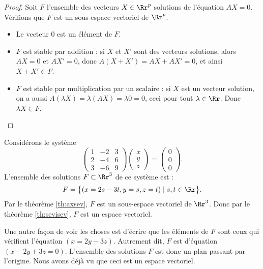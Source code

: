 \documentclass[class=report,crop=false]{standalone}
\begin{document}
\begin{proof}
Soit $F$ l'ensemble des vecteurs $X \in \Rr^p$ solutions de l'équation $AX=0$.
Vérifions que $F$ est un sous-espace vectoriel de $\Rr^p$.
\begin{itemize}
  \item Le vecteur $0$ est un élément de $F$.
  \item $F$ est stable par addition : si $X$ et $X'$ sont des vecteurs solutions,
  alors $AX = 0$ et $AX' = 0$, donc $A(X + X') = AX + AX' = 0$, et ainsi $X+X'\in F$.
  \item  $F$ est stable par multiplication par un scalaire : si $X$ est un vecteur solution,
  on a aussi $A (\lambda X) = \lambda (AX) = \lambda 0 = 0$, ceci pour tout $\lambda\in \Rr$.
  Donc $\lambda X \in F$.
\end{itemize}
\end{proof}

\begin{exemple} Considérons le système
 $$\left(
\begin{array}{crc}
1 & -2 & 3\\ 2 & -4 & 6\\ 3 & -6 & 9
\end{array}\right)
\left(\begin{array}{c}
x \\ y\\ z
\end{array}\right) =
\left(\begin{array}{c}
0\\ 0\\0
\end{array}\right). $$
L'ensemble des solutions $F \subset \Rr^3$ de ce système est :
$$F = \big\{ (x =  2s - 3t, y  =  s, z  =  t) \mid s,t \in \Rr \big\}.$$
Par le théorème \ref{th:axsev}, $F$ est un sous-espace vectoriel de $\Rr^3$.
Donc par le théorème \ref{th:sevisev}, $F$ est un espace vectoriel.



Une autre façon de voir les choses est d'écrire que les éléments de $F$ sont ceux qui vérifient
l'équation $(x = 2y - 3z)$.
Autrement dit, $F$ est d'équation $(x-2y + 3z = 0)$.
L'ensemble des solutions $F$ est donc un plan passant par l'origine.
Nous avons déjà vu que ceci est un espace vectoriel.
\end{exemple}


\end{document}
